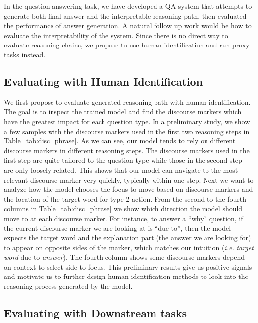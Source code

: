 In the question answering task, we have developed a QA system that attempts to generate both final answer and the interpretable reasoning path, then evaluated the performance of answer generation. A natural follow up work would be how to evaluate the interpretability of the system. Since there is no direct way to evaluate reasoning chains, we propose to use human identification and run proxy tasks instead. 


\subsection{Evaluating with Human Identification} \label{future_reason}


We first propose to evaluate generated reasoning path with human identification. The goal is to inspect the trained model and find the discourse markers which have the greatest impact for each question type. In a preliminary study, we show a few samples with the discourse markers used in the first two reasoning steps in Table~\ref{tab:disc_phrase}. As we can see, our model tends to rely on different discourse markers in different reasoning steps. The discourse markers used in the first step are quite tailored to the question type while those in the second step are only loosely related. This shows that our model can navigate to the most relevant discourse marker very quickly, typically within one step. Next we want to analyze how the model chooses the focus to move based on discourse markers and the location of the target word for type 2 action. From the second to the fourth columns in Table~\ref{tab:disc_phrase} we show which direction the model should move to at each discourse marker. For instance, to answer a ``why'' question, if the current discourse marker we are looking at is ``due to'', then the model expects the target word and the explanation part (the answer we are looking for) to appear on opposite sides of the marker, which matches our intuition (\textit{i.e.} \textit{target word} due to \textit{answer}). The fourth column shows some discourse markers depend on context to select side to focus. This preliminary results give us positive signals and motivate us to further design human identification methods to look into the reasoning process generated by the model.

\subsection{Evaluating with Downstream tasks}

